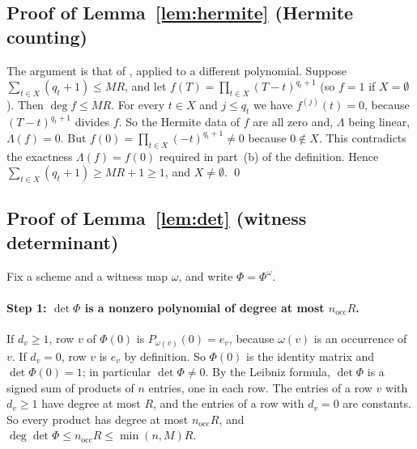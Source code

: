 \documentclass[11pt,a4paper]{article}
\theoremstyle{definition}
\theoremstyle{remark}
\newcommand{\nocc}{n_{\mathrm{occ}}}
\begin{document}
\subsection{Proof of Lemma~\ref{lem:hermite} (Hermite counting)}

The argument is that of \cite[Lemma~6.2]{DL}, applied to a different polynomial. Suppose
$\sum_{t\in X}(q_t+1)\le MR$, and let $f(T)=\prod_{t\in X}(T-t)^{q_t+1}$ (so $f=1$ if
$X=\emptyset$). Then $\deg f\le MR$. For every $t\in X$ and $j\le q_t$ we have
$f^{(j)}(t)=0$, because $(T-t)^{q_t+1}$ divides $f$. So the Hermite data of $f$ are all zero
and, $\Lambda$ being linear, $\Lambda(f)=0$. But
$f(0)=\prod_{t\in X}(-t)^{q_t+1}\ne0$ because $0\notin X$. This contradicts the exactness
$\Lambda(f)=f(0)$ required in part~(b) of the definition. Hence
$\sum_{t\in X}(q_t+1)\ge MR+1\ge1$, and $X\ne\emptyset$. \qed

\subsection{Proof of Lemma~\ref{lem:det} (witness determinant)}

Fix a scheme and a witness map $\omega$, and write $\Phi=\Phi^\omega$.

\paragraph{Step 1: $\det\Phi$ is a nonzero polynomial of degree at most $\nocc R$.} If
$d_v\ge1$, row $v$ of $\Phi(0)$ is $P_{\omega(v)}(0)=e_v$, because $\omega(v)$ is an
occurrence of $v$. If $d_v=0$, row $v$ is $e_v$ by definition. So $\Phi(0)$ is the identity
matrix and $\det\Phi(0)=1$; in particular $\det\Phi\ne0$. By the Leibniz formula, $\det\Phi$
is a signed sum of products of $n$ entries, one in each row. The entries of a row $v$ with
$d_v\ge1$ have degree at most $R$, and the entries of a row with $d_v=0$ are constants. So
every product has degree at most $\nocc R$, and $\deg\det\Phi\le\nocc R\le\min(n,M)R$.
\end{document}
